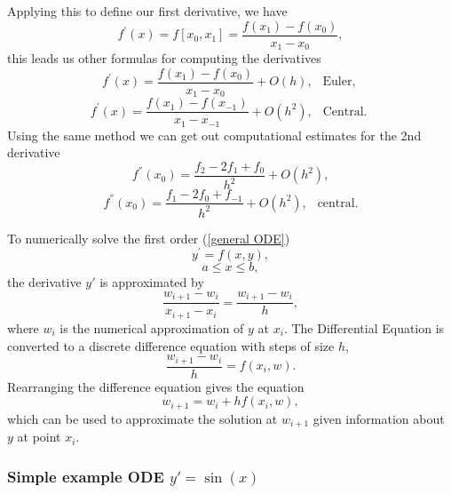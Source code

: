 Applying this to define our first derivative, we have
\[
f^{'}(x)=f[x_0,x_1] = \frac{f(x_1)-f(x_0)}{x_1-x_0},\]
this leads us other formulas for computing the derivatives
\[ f^{'}(x) = \frac{f(x_1)-f(x_0)}{x_1-x_0}+O(h), \ \ \mbox{  Euler,  }\]
\[ f^{'}(x) = \frac{f(x_1)-f(x_{-1})}{x_1-x_{-1}}+O(h^2), \ \ \mbox{    Central.  }\]
Using the same method we can get out computational estimates for the 2nd 
derivative
\[f^{''}(x_0)=\frac{f_{2}-2f_1+f_0}{h^2}+O(h^2),\]
\[f^{''}(x_0)=\frac{f_{1}-2f_0+f_{-1}}{h^2}+O(h^2), \ \ \mbox{   central.}\]
\begin{example} To numerically solve the first order  (\ref{general ODE})
\[ y^{'} = f(x,y), \]
\[a\leq x \leq b, \]
the derivative $y{'}$ is approximated by \[\frac{w_{i+1}-w_{i}}{x_{i+1}-x_{i}}=\frac{w_{i+1}-w_{i}}{h},\]
where $w_i$ is the numerical approximation of $y$ at $x_i$.
The Differential Equation is converted to a discrete difference equation with steps of size $h$, 
\[\frac{w_{i+1}-w_i}{h}=f(x_i,w). \]
Rearranging the difference equation gives the equation 
\[w_{i+1}=w_i+hf(x_i,w), \]
which can be used to approximate the solution at $w_{i+1}$ given information about $y$ at point $x_i$.
\end{example}

\subsubsection{Simple example ODE $y'=\sin(x)$}


